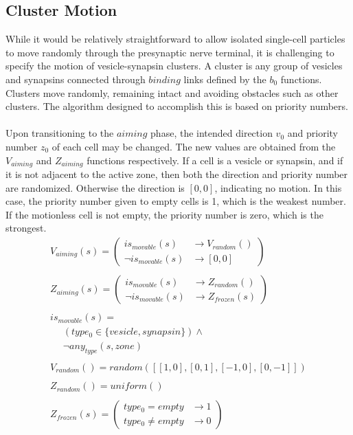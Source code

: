 \documentclass{acm_proc_article-sp}
\begin{document}
\subsection{Cluster Motion} \label{Motion}
While it would be relatively straightforward to allow 
isolated single-cell particles to move randomly through 
the presynaptic nerve terminal, it is challenging to 
specify the motion of vesicle-synapsin clusters.  A 
cluster is any group of vesicles and synapsins connected
through $binding$ links defined by the $b_0$ functions. 
Clusters move randomly, remaining intact and avoiding
obstacles such as other clusters.  The algorithm designed
to accomplish this is based on priority numbers. \\
\\
Upon transitioning to the $aiming$ phase, the intended 
direction $v_0$ and priority number $z_0$ of each cell 
may be changed.  The new values are obtained from the 
$V_{aiming}$ and $Z_{aiming}$ functions respectively.
If a cell is a vesicle or synapsin, and if it is not
adjacent to the active zone, then both the direction
and priority number are randomized.  Otherwise the
direction is $[0,0]$, indicating no motion.  In this
case, the priority number given to empty cells is 1, 
which is the weakest number.  If the motionless cell
is not empty, the priority number is zero, which is
the strongest.
\begin{displaymath} \begin{array}{l}
V_{aiming}(s) = \left( \begin{array}{ll} is_{movable}(s)      & \rightarrow V_{random}() \\
                                         \neg is_{movable}(s) & \rightarrow [0, 0]  \end{array} \right) \\
\\
Z_{aiming}(s) = \left( \begin{array}{ll} is_{movable}(s)      & \rightarrow Z_{random}() \\
                                         \neg is_{movable}(s) & \rightarrow Z_{frozen}(s) \end{array} \right) \\
\\
is_{movable}(s) = \\
\hspace{16pt} (type_0 \in \{ vesicle, synapsin\}) \wedge \\
\hspace{16pt} \neg any_{type}(s, zone) \\
\\
V_{random}() = random([[1, 0], [0, 1], [-1, 0], [0, -1]]) \\
\\
Z_{random}() = uniform() \\
\\
Z_{frozen}(s) = \left( \begin{array}{ll} type_0 = empty   & \rightarrow 1 \\
                                          type_0 \ne empty & \rightarrow 0 \end{array} \right) \\
\end{array} \end{displaymath}
\end{document}
